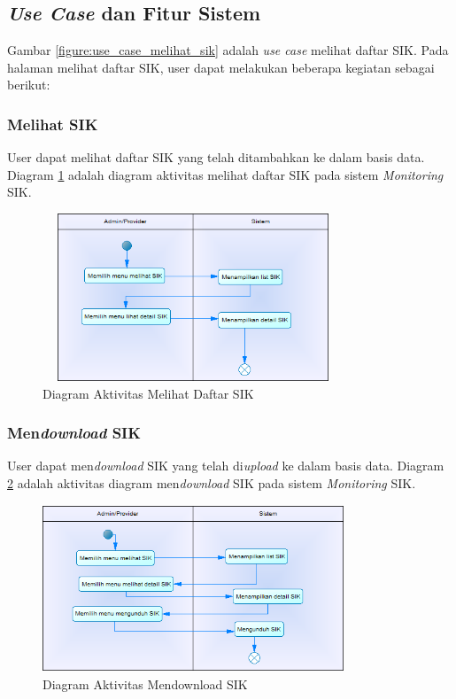 \subsection{\textit{Use Case} dan Fitur Sistem}
Gambar \ref{figure:use_case_melihat_sik} adalah \textit{use case} melihat daftar SIK. Pada halaman melihat daftar SIK, user dapat melakukan beberapa kegiatan sebagai berikut:
	\subsubsection{Melihat SIK}
	User dapat melihat daftar SIK yang telah ditambahkan ke dalam basis data. Diagram \ref{figure:activity_melihat_sik} adalah diagram aktivitas melihat daftar SIK pada sistem \textit{Monitoring} SIK.
	\begin{figure}[h]
	\centerline {\includegraphics[width=9cm,height=5cm]{bab4/ActivityDiagram_MelihatSIK.png}}
	\caption{Diagram Aktivitas Melihat Daftar SIK}
	\label{figure:activity_melihat_sik}
	\end{figure}
	
	\subsubsection{Men\textit{download} SIK}
	User dapat men\textit{download} SIK yang telah di\textit{upload} ke dalam basis data. Diagram \ref{figure:activity_mendownload_sik} adalah aktivitas diagram men\textit{download} SIK pada sistem \textit{Monitoring} SIK.
	\begin{figure}[h]
	\centerline
	{\includegraphics[width=9cm,height=5cm]{bab4/ActivityDiagram_DownloadSIK.png}}
	\caption{Diagram Aktivitas Mendownload SIK}
	\label{figure:activity_mendownload_sik}
	\end{figure}

